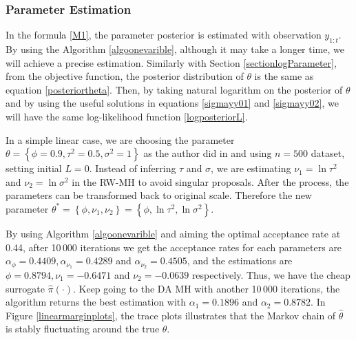 \subsubsection*{Parameter Estimation}

In the formula \eqref{M1}, the parameter posterior is estimated with observation $y_{1:t}$. By using the Algorithm \ref{algoonevarible}, although it may take a longer time, we will achieve a precise estimation. Similarly with Section \ref{sectionlogParameter}, from the objective function, the posterior distribution of $\theta$ is 
the same as equation \eqref{posteriortheta}. 
Then, by taking natural logarithm on the posterior of $\theta$ and by using the useful solutions in equations \eqref{sigmayy01} and \eqref{sigmayy02}, we will have
the same log-likelihood function \eqref{logposteriorL}.

In a simple linear case, we are choosing the parameter $\theta = \left\lbrace \phi=0.9,\tau^2=0.5,\sigma^2=1\right\rbrace$ as the author did in \citep{lopes2011particle} and using $n=500$ dataset, setting initial $L=0$. Instead of inferring $\tau$ and $\sigma$, we are estimating $\nu_1 = \ln \tau^2$ and $\nu_2 = \ln \sigma^2$ in the RW-MH to avoid singular proposals. After the process, the parameters can be transformed back to original scale. Therefore the new parameter  $\theta^* =  \left\lbrace \phi,\nu_1,\nu_2\right\rbrace = \left\lbrace \phi,\ln\tau^2,\ln\sigma^2\right\rbrace$. 

By using Algorithm \ref{algoonevarible} and aiming the optimal acceptance rate at 0.44, after 10\,000 iterations we get the acceptance rates for each parameters are $\alpha_\phi = 0.4409, \alpha_{\nu_1}= 0.4289$ and $\alpha_{\nu_2}= 0.4505$, and the estimations are $\phi =0.8794, \nu_1= -0.6471$ and $\nu_2= -0.0639$ respectively. Thus, we have the cheap surrogate $\hat{\pi}(\cdot)$. Keep going to the DA MH with another 10\,000 iterations, the algorithm returns the best estimation with $\alpha_1=0.1896$ and $\alpha_2 = 0.8782$. In Figure \ref{linearmarginplots}, the trace plots illustrates that the Markov chain of $\hat{\theta}$ is stably fluctuating around the true $\theta$. 

